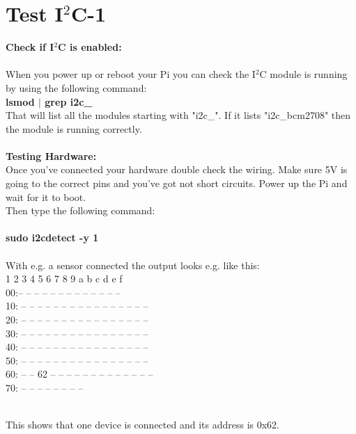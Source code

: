 \section{Test I$^2$C-1}
\label{sec:testi2c1}

\textbf{Check if I$^2$C is enabled:}\\\\
When you power up or reboot your Pi you can check the I$^2$C module is running by using the following command:\\
\ttfamily \textbf{lsmod $|$ grep i2c\_}\\
\normalfont
That will list all the modules starting with "i2c\_". If it lists "i2c\_bcm2708" then the module is running correctly.\\\\

\textbf{Testing Hardware:}\\
Once you've connected your hardware double check the wiring. Make sure 5V is going to the correct pins and you've got not short circuits. Power up the Pi and wait for it to boot.\\
Then type the following command:\\\\
\ttfamily \textbf{sudo i2cdetect -y 1}\\\\
\normalfont 
With e.g. a sensor connected the output looks e.g. like this:\\

\ttfamily
 \quad{}  1  2  3  4  5  6  7  8  9  a  b  c  d  e  f \\
00:\qquad\quad\quad-- -- -- -- -- -- -- -- -- -- -- -- -- \\
10: -- -- -- -- -- -- -- -- -- -- -- -- -- -- -- -- \\
20: -- -- -- -- -- -- -- -- -- -- -- -- -- -- -- -- \\
30: -- -- -- -- -- -- -- -- -- -- -- -- -- -- -- -- \\
40: -- -- -- -- -- -- -- -- -- -- -- -- -- -- -- -- \\
50: -- -- -- -- -- -- -- -- -- -- -- -- -- -- -- -- \\
60: -- -- 62 -- -- -- -- -- -- -- -- -- -- -- -- -- \\
70: -- -- -- -- -- -- -- -- \\\\
\normalfont

This shows that one device is connected and its address is 0x62.\\ 



